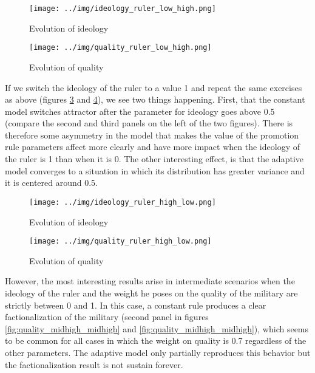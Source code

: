 \begin{figure}[!h]
  \centering
  \caption{Evolution of ideology}
  \texttt{[image: ../img/ideology\_ruler\_low\_high.png]}
  \label{fig:ideology_low_high}
\end{figure}

\begin{figure}[!h]
  \centering
  \caption{Evolution of quality}
  \texttt{[image: ../img/quality\_ruler\_low\_high.png]}
  \label{fig:quality_low_high}
\end{figure}

\clearpage 

If we switch the ideology of the ruler to a value 1 and repeat the same
exercises as above (figures \ref{fig:ideology_high_low} and
\ref{fig:quality_high_low}), we see two things happening. First, that the
constant model switches attractor after the parameter for ideology goes above
0.5 (compare the second and third panels on the left of the two figures). There
is therefore some asymmetry in the model that makes the value of the promotion
rule parameters affect more clearly and have more impact when the ideology of
the ruler is 1 than when it is 0. The other interesting effect, is that the
adaptive model converges to a situation in which its distribution has greater
variance and it is centered around 0.5.

\begin{figure}[!h]
  \centering
  \caption{Evolution of ideology}
  \texttt{[image: ../img/ideology\_ruler\_high\_low.png]}
  \label{fig:ideology_high_low}
\end{figure}

\begin{figure}[!h]
  \centering
  \caption{Evolution of quality}
  \texttt{[image: ../img/quality\_ruler\_high\_low.png]}
  \label{fig:quality_high_low}
\end{figure}

\clearpage 

However, the most interesting results arise in intermediate scenarios when the
ideology of the ruler and the weight he poses on the quality of the military are
strictly between 0 and 1. In this case, a constant rule produces a clear
factionalization of the military (second panel in figures
\ref{fig:quality_midhigh_midhigh} and \ref{fig:quality_midhigh_midhigh}), which
seems to be common for all cases in which the weight on quality is 0.7
regardless of the other parameters. The adaptive model only partially reproduces
this behavior but the factionalization result is not sustain forever. 

